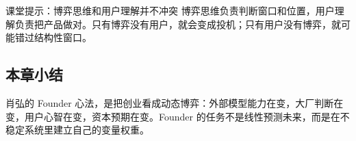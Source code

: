 \begin{knowledgebox}{课堂提示：博弈思维和用户理解并不冲突}
博弈思维负责判断窗口和位置，用户理解负责把产品做对。只有博弈没有用户，就会变成投机；只有用户没有博弈，就可能错过结构性窗口。
\end{knowledgebox}

\subsection{本章小结}

肖弘的 Founder 心法，是把创业看成动态博弈：外部模型能力在变，大厂判断在变，用户心智在变，资本预期在变。Founder 的任务不是线性预测未来，而是在不稳定系统里建立自己的变量权重。


